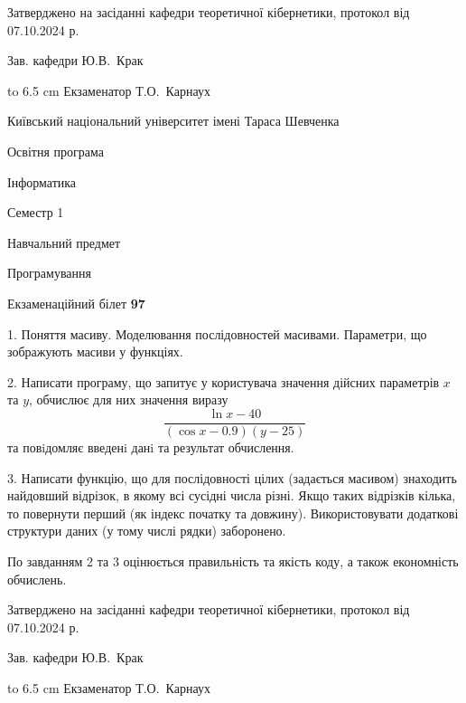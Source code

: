 \documentclass[12pt, ukrainian]{article}
\begin{document}
{\smallskip\smallskip \begin {scriptsize} Затверджено на засіданні кафедри теоретичної кібернетики, протокол   від   07.10.2024 р.\par\smallskip\smallskip\smallskip\smallskip
{\parbox {6.5 cm} {Зав. кафедри \dotfill Ю.В.~Крак}}\hspace {0.7cm} {\hbox to 6.5 cm { Екзаменатор \dotfill Т.О.~Карнаух}} \end{scriptsize}}
\newpage
{{\begin {scriptsize}\par
{ \center  Київський національний університет імені Тараса Шевченка \par}
{\parbox {5 cm}{Освітня програма \hfill}{\parbox {7 cm}{Інформатика\hfill}}\parbox {6 cm}{\hfill Семестр 1}}\par
{\parbox {5 cm} {Навчальний предмет \hfill}\parbox {7 cm}{Програмування \hfill}\parbox {6cm}{\hfill}\par}\vspace{-15pt} \end{scriptsize}}{\center Екзаменаційний білет \No \textbf { 97 }\par}}
{%
1. Поняття масиву. Моделювання послідовностей масивами. Параметри, що зображують масиви у функціях.%
\par
2. Написати програму, що запитує у користувача значення дійсних параметрів $x$ та $y$, обчислює для них значення виразу 
$$\frac{\ln x - 40}{(\cos x - 0.9) (y - 25)}$$ 
та повiдомляє введенi данi та результат обчислення.

\par
3. Написати функцію, що для послідовності цілих (задається масивом) знаходить найдовший відрізок, в якому всі сусідні числа різні. Якщо таких відрізків кілька, то повернути перший (як індекс початку та довжину). Використовувати додаткові структури даних (у тому числі рядки) заборонено.

По завданням 2 та 3 оцінюється правильність та якість коду, а також економність обчислень.

}
{\smallskip\smallskip \begin {scriptsize} Затверджено на засіданні кафедри теоретичної кібернетики, протокол   від   07.10.2024 р.\par\smallskip\smallskip\smallskip\smallskip
{\parbox {6.5 cm} {Зав. кафедри \dotfill Ю.В.~Крак}}\hspace {0.7cm} {\hbox to 6.5 cm { Екзаменатор \dotfill Т.О.~Карнаух}} \end{scriptsize}}
\end{document}
